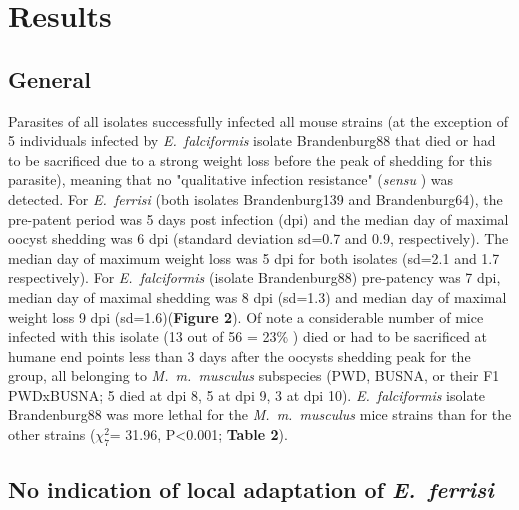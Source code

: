 \documentclass[12pt]{article}
\begin{document}
\section*{Results}
\setcounter{subsection}{0}
\renewcommand*{\theHsubsection}{chX.\the\value{subsection}}

\subsection{General}

Parasites of all isolates successfully infected all mouse strains (at the exception of 5 individuals infected by \textit{E.~falciformis} isolate Brandenburg88 that died or had to be sacrificed due to a strong weight loss before the peak of shedding for this parasite), meaning that no "qualitative infection resistance" (\textit{sensu} \cite{Gandon2000}) was detected. For \textit{E.~ferrisi }(both isolates Brandenburg139 and Brandenburg64), the pre-patent period was 5 days post infection (dpi) and the median day of maximal oocyst shedding was 6 dpi (standard deviation sd=0.7 and 0.9, respectively). The median day of maximum weight loss was 5 dpi for both isolates (sd=2.1 and 1.7 respectively). For \textit{E.~falciformis} (isolate Brandenburg88) pre-patency was 7 dpi, median day of maximal shedding was 8 dpi (sd=1.3) and median day of maximal weight loss 9 dpi (sd=1.6)(\textbf{Figure 2}). Of note a considerable number of mice infected with this isolate (13 out of 56 = 23$\%$ ) died or had to be sacrificed at humane end points less than 3 days after the oocysts shedding peak for the group, all belonging to \textit{M.~m.~musculus} subspecies (PWD, BUSNA, or their F1 PWDxBUSNA; 5 died at dpi 8, 5 at dpi 9, 3 at dpi 10). \textit{E.~falciformis }isolate Brandenburg88 was more lethal for the \textit{M.~m.~musculus} mice strains than for the other strains ($\chi_{7}^{2}$= 31.96, P<0.001; \textbf{Table 2}).\par

\subsection{No indication of local adaptation of \textit{E.~ferrisi}}
\end{document}
